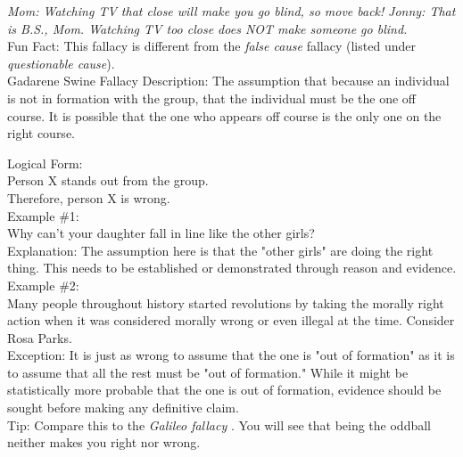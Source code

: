 \documentclass[a4paper,12pt,single,pdftex]{scrbook}
\begin{document}
    
      {\em Mom: Watching TV that close will make you go blind, so move back!} \newline
{\em Jonny: That is B.S., Mom. Watching TV too close does NOT make someone go blind.}
    \\

    
      Fun Fact: This fallacy is different from the {\em false cause}  fallacy (listed under {\em questionable cause}).
    \\

  

Gadarene Swine Fallacy
    Description: The assumption that because an individual is not in formation with the group, that the individual must be the one off course. It is possible that the one who appears off course is the only one on the right course.

    
      Logical Form:
    \\

    
      Person X stands out from the group.
    \\

    
      Therefore, person X is wrong.
    \\

    
      Example \#1:
    \\

    
      Why can't your daughter fall in line like the other girls?
    \\

    
      Explanation: The assumption here is that the "other girls" are doing the right thing. This needs to be established or demonstrated through reason and evidence.
    \\

    
      Example \#2:
    \\

    
      Many people throughout history started revolutions by taking the morally right action when it was considered morally wrong or even illegal at the time. Consider Rosa Parks.
    \\

    
      Exception: It is just as wrong to assume that the one is "out of formation" as it is to assume that all the rest must be "out of formation." While it might be statistically more probable that the one is out of formation, evidence should be sought before making any definitive claim.
    \\

    
      Tip: Compare this to the {\it Galileo fallacy} . You will see that being the oddball neither makes you right nor wrong.
    \\
\end{document}
